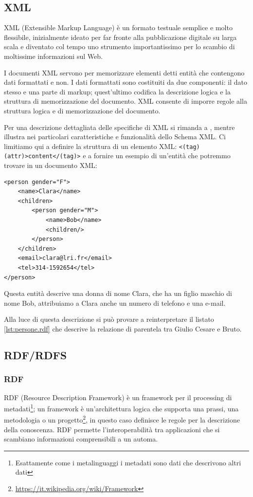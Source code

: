 \subsection{XML}
XML (Extensible Markup Language) è un formato testuale semplice e molto flessibile, inizialmente ideato per far fronte alla pubblicazione digitale su larga scala e diventato col tempo uno strumento importantissimo per lo scambio di moltissime informazioni sul Web\cite{w3cXml}.

I documenti XML servono per memorizzare elementi detti entità che contengono dati formattati e non. I dati formattati sono costituiti da due componenti: il dato stesso e una parte di markup; quest'ultimo codifica la descrizione logica e la struttura di memorizzazione del documento. XML consente di imporre regole alla struttura logica e di memorizzazione del documento\cite{world2006extensible}.

Per una descrizione dettagliata delle specifiche di XML si rimanda a \cite{world2006extensible}, mentre \cite{li2005testing} illustra nei particolari caratteristiche e funzionalità dello Schema XML. Ci limitiamo qui a definire la struttura di un elemento XML: \verb|<(tag) (attr)>content</(tag)>| e a fornire un esempio di un'entità che potremmo trovare in un documento XML:
\begin{verbatim}
<person gender="F">
	<name>Clara</name>
	<children>
		<person gender="M">
			<name>Bob</name>
			<children/>
		</person>
	</children>
	<email>clara@lri.fr</email>
	<tel>314-1592654</tel>
</person>
\end{verbatim}
Questa entità descrive una donna di nome Clara, che ha un figlio maschio di nome Bob, attribuiamo a Clara anche un numero di telefono e una e-mail.

Alla luce di questa descrizione si può provare a reinterpretare il listato \ref{lst:persone.rdf} che descrive la relazione di parentela tra Giulio Cesare e Bruto.
\subsection{RDF/RDFS}
\subsubsection{RDF}
RDF (Resource Description Framework) è un framework per il processing di metadati\footnote{Esattamente come i metalinguaggi i metadati sono dati che descrivono altri dati}; un framework è un'architettura logica che supporta una prassi, una metodologia o un progetto\footnote{\url{https://it.wikipedia.org/wiki/Framework}}, in questo caso definisce le regole per la descrizione della conoscenza. RDF permette l'interoperabilità tra applicazioni che si scambiano informazioni comprensibili a un automa.

